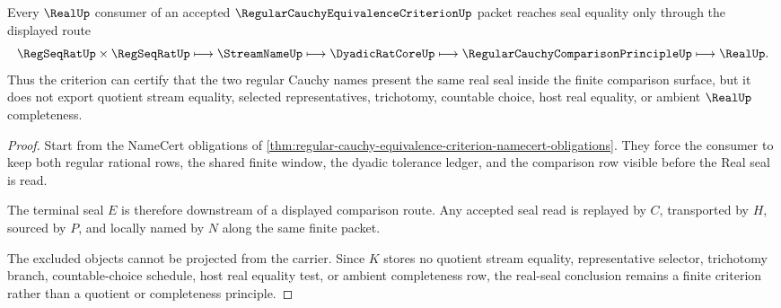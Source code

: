 \begin{theorem}
\label{thm:regular-cauchy-equivalence-criterion-real-seal}
Every $\RealUp$ consumer of an accepted $\RegularCauchyEquivalenceCriterionUp$ packet reaches seal equality only through the displayed route
$$
\RegSeqRatUp\times\RegSeqRatUp
\longmapsto
\StreamNameUp
\longmapsto
\DyadicRatCoreUp
\longmapsto
\RegularCauchyComparisonPrincipleUp
\longmapsto
\RealUp .
$$
Thus the criterion can certify that the two regular Cauchy names present the same real seal inside the finite comparison surface, but it does not export quotient stream equality, selected representatives, trichotomy, countable choice, host real equality, or ambient $\RealUp$ completeness.
\end{theorem}
\begin{proof}
Start from the NameCert obligations of \autoref{thm:regular-cauchy-equivalence-criterion-namecert-obligations}. They force the consumer to keep both regular rational rows, the shared finite window, the dyadic tolerance ledger, and the comparison row visible before the Real seal is read.

The terminal seal $E$ is therefore downstream of a displayed comparison route. Any accepted seal read is replayed by $C$, transported by $H$, sourced by $P$, and locally named by $N$ along the same finite packet.

The excluded objects cannot be projected from the carrier. Since $K$ stores no quotient stream equality, representative selector, trichotomy branch, countable-choice schedule, host real equality test, or ambient completeness row, the real-seal conclusion remains a finite criterion rather than a quotient or completeness principle.
\end{proof}


\begin{closurestatus}{\RegularCauchyEquivalenceCriterionUp}
  \theoryclosure{\seedClosure}
  \formalstatus{\unformalizedV}
\end{closurestatus}

